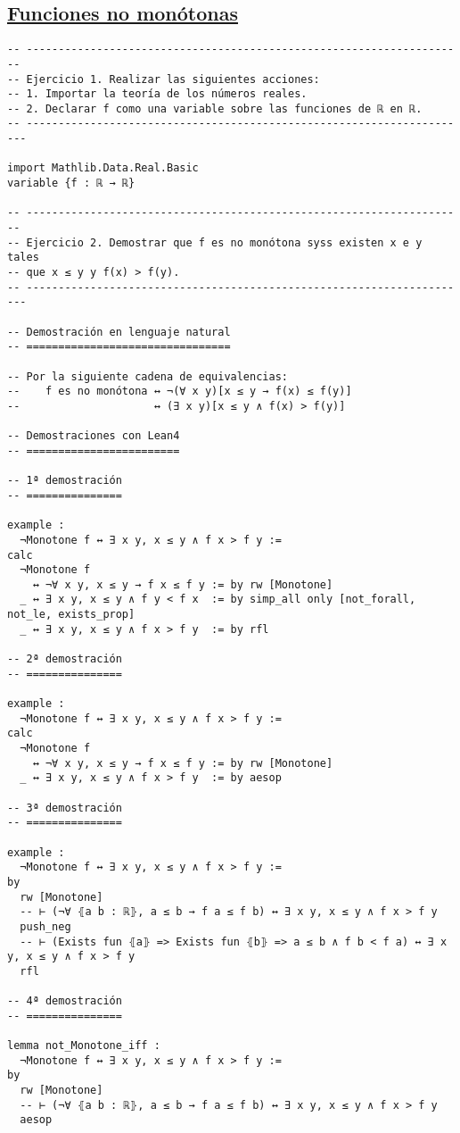 \subsection{\href{./src/Logica/Funciones\_no\_monotonas.lean}{Funciones no monótonas}}
\label{sec:org365d9f9}
\begin{verbatim}
-- ---------------------------------------------------------------------
-- Ejercicio 1. Realizar las siguientes acciones:
-- 1. Importar la teoría de los números reales.
-- 2. Declarar f como una variable sobre las funciones de ℝ en ℝ.
-- ----------------------------------------------------------------------

import Mathlib.Data.Real.Basic
variable {f : ℝ → ℝ}

-- ---------------------------------------------------------------------
-- Ejercicio 2. Demostrar que f es no monótona syss existen x e y tales
-- que x ≤ y y f(x) > f(y).
-- ----------------------------------------------------------------------

-- Demostración en lenguaje natural
-- ================================

-- Por la siguiente cadena de equivalencias:
--    f es no monótona ↔ ¬(∀ x y)[x ≤ y → f(x) ≤ f(y)]
--                     ↔ (∃ x y)[x ≤ y ∧ f(x) > f(y)]

-- Demostraciones con Lean4
-- ========================

-- 1ª demostración
-- ===============

example :
  ¬Monotone f ↔ ∃ x y, x ≤ y ∧ f x > f y :=
calc
  ¬Monotone f
    ↔ ¬∀ x y, x ≤ y → f x ≤ f y := by rw [Monotone]
  _ ↔ ∃ x y, x ≤ y ∧ f y < f x  := by simp_all only [not_forall, not_le, exists_prop]
  _ ↔ ∃ x y, x ≤ y ∧ f x > f y  := by rfl

-- 2ª demostración
-- ===============

example :
  ¬Monotone f ↔ ∃ x y, x ≤ y ∧ f x > f y :=
calc
  ¬Monotone f
    ↔ ¬∀ x y, x ≤ y → f x ≤ f y := by rw [Monotone]
  _ ↔ ∃ x y, x ≤ y ∧ f x > f y  := by aesop

-- 3ª demostración
-- ===============

example :
  ¬Monotone f ↔ ∃ x y, x ≤ y ∧ f x > f y :=
by
  rw [Monotone]
  -- ⊢ (¬∀ ⦃a b : ℝ⦄, a ≤ b → f a ≤ f b) ↔ ∃ x y, x ≤ y ∧ f x > f y
  push_neg
  -- ⊢ (Exists fun ⦃a⦄ => Exists fun ⦃b⦄ => a ≤ b ∧ f b < f a) ↔ ∃ x y, x ≤ y ∧ f x > f y
  rfl

-- 4ª demostración
-- ===============

lemma not_Monotone_iff :
  ¬Monotone f ↔ ∃ x y, x ≤ y ∧ f x > f y :=
by
  rw [Monotone]
  -- ⊢ (¬∀ ⦃a b : ℝ⦄, a ≤ b → f a ≤ f b) ↔ ∃ x y, x ≤ y ∧ f x > f y
  aesop


\end{verbatim}
